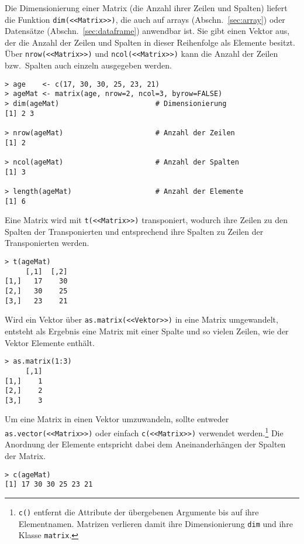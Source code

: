 Die Dimensionierung einer Matrix (die Anzahl ihrer Zeilen und Spalten) liefert die Funktion \lstinline!dim(<<Matrix>>)!, die auch auf arrays (Abschn.\ \ref{sec:array}) oder Datensätze (Abschn.\ \ref{sec:dataframe}) anwendbar ist. Sie gibt einen Vektor aus, der die Anzahl der Zeilen und Spalten in dieser Reihenfolge als Elemente besitzt. Über \lstinline!nrow(<<Matrix>>)! und \lstinline!ncol(<<Matrix>>)! kann die Anzahl der Zeilen bzw.\ Spalten auch einzeln ausgegeben werden.
\begin{lstlisting}
> age    <- c(17, 30, 30, 25, 23, 21)
> ageMat <- matrix(age, nrow=2, ncol=3, byrow=FALSE)
> dim(ageMat)                       # Dimensionierung
[1] 2 3

> nrow(ageMat)                      # Anzahl der Zeilen
[1] 2

> ncol(ageMat)                      # Anzahl der Spalten
[1] 3

> length(ageMat)                    # Anzahl der Elemente
[1] 6
\end{lstlisting}

Eine Matrix wird mit \lstinline!t(<<Matrix>>)! transponiert, wodurch ihre Zeilen zu den Spalten der Transponierten und entsprechend ihre Spalten zu Zeilen der Transponierten werden.
\begin{lstlisting}
> t(ageMat)
     [,1]  [,2]
[1,]   17    30
[2,]   30    25
[3,]   23    21
\end{lstlisting}

Wird ein Vektor über \lstinline!as.matrix(<<Vektor>>)! in eine Matrix umgewandelt, entsteht als Ergebnis eine Matrix mit einer Spalte und so vielen Zeilen, wie der Vektor Elemente enthält.
\begin{lstlisting}
> as.matrix(1:3)
     [,1]
[1,]    1
[2,]    2
[3,]    3
\end{lstlisting}

Um eine Matrix in einen Vektor umzuwandeln, sollte entweder \lstinline!as.vector(<<Matrix>>)! oder einfach \lstinline!c(<<Matrix>>)! verwendet werden.\footnote{\lstinline!c()! entfernt die Attribute der übergebenen Argumente bis auf ihre Elementnamen. Matrizen verlieren damit ihre Dimensionierung \lstinline!dim! und ihre Klasse \lstinline!matrix!.} Die Anordnung der Elemente entspricht dabei dem Aneinanderhängen der Spalten der Matrix.
\begin{lstlisting}
> c(ageMat)
[1] 17 30 30 25 23 21
\end{lstlisting}

